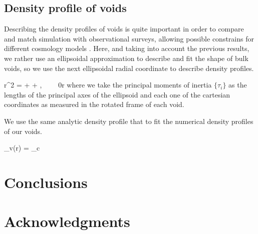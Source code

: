 \documentclass[a4,useAMS,usenatbib,usegraphicx]{latex/mn2e}
\begin{document}
\subsection{Density profile of voids}
\label{subsec:density_voids}


Describing the density profiles of voids is quite important in order to 
compare and match simulation with observational surveys, allowing possible
constrains for different cosmology models \SRKED{[Hamaous, et.al 2014]}. 
Here, and taking into account the previous results, we rather use an 
ellipsoidal approximation to describe and fit the shape of bulk voids, so 
we use the next ellipsoidal radial coordinate to describe density profiles.


{
r^2 =  +  + ,
\ \ \ \ 0\leq r 
}
where we take the principal moments of inertia $\{\tau_i \}$ as the 
lengths of the principal axes of the ellipsoid and each one of the 
cartesian coordinates as measured in the rotated frame of each void.


We use the same analytic density profile that \SRKED{[Hamaous, et.al 2014]} 
to fit the numerical density profiles of our voids.


{
\delta_v(r) = \delta_c
}



\section{Conclusions}
\label{sec:conclusions}


\section*{Acknowledgments}  
\end{document}
